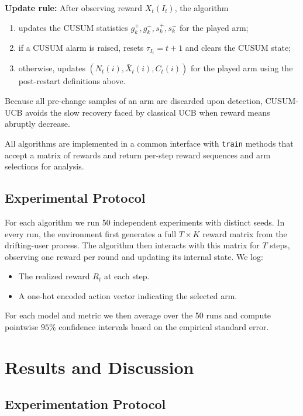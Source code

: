 \documentclass{scrartcl}
\begin{document}
\begin{itemize}
\textbf{Update rule:}
After observing reward $X_t(I_t)$, the algorithm
\begin{enumerate}
\item updates the CUSUM statistics $g_k^+,g_k^-,s_k^+,s_k^-$ for the played arm;
\item if a CUSUM alarm is raised, resets $\tau_{I_t}=t+1$ and clears the CUSUM state;
\item otherwise, updates $(N_t(i),\bar X_t(i),C_t(i))$ for the played arm using the post-restart definitions above.
\end{enumerate}
Because all pre-change samples of an arm are discarded upon detection,
CUSUM-UCB avoids the slow recovery faced by classical UCB when reward
means abruptly decrease. 
\end{itemize}

   




All algorithms are implemented in a common interface with \texttt{train}
methods that accept a matrix of rewards and return per-step reward sequences
and arm selections for analysis.

\subsection{Experimental Protocol}

For each algorithm we run 50 independent experiments with distinct seeds. In
every run, the environment first generates a full $T \times K$ reward matrix
from the drifting-user process. The algorithm then interacts with this matrix
for $T$ steps, observing one reward per round and updating its internal state.
\FloatBarrier 
We log:
\begin{itemize}
	\item The realized reward $R_t$ at each step.
	\item A one-hot encoded action vector indicating the selected arm.
\end{itemize}
For each model and metric we then average over the 50 runs and compute
pointwise $95\%$ confidence intervals based on the empirical standard error.

\section{Results and Discussion}

\subsection{Experimentation Protocol}
\end{document}
